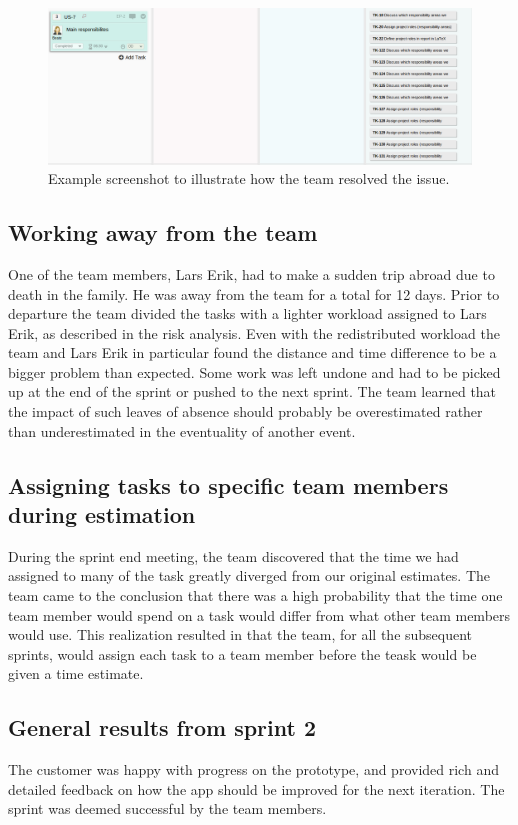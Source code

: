 \begin{figure}[H]
\includegraphics[width=\textwidth]{ch/devProcess/fig/addsTasks.png}
\caption{Example screenshot to illustrate how the team resolved the issue.}
\label{fig:addsTasks}
\end{figure}

\subsection{Working away from the team}
One of the team members, Lars Erik, had to make a sudden trip abroad due to
death in the family. He was away from the team for a total for 12 days. Prior
to departure the team divided the tasks with a lighter workload assigned to Lars
Erik, as described in the risk analysis. Even with the redistributed workload
the team and Lars Erik in particular found the distance and time difference to
be a bigger problem than expected. Some work was left undone and had to be
picked up at the end of the sprint or pushed to the next sprint. The team
learned that the impact of such leaves of absence should probably be
overestimated rather than underestimated in the eventuality of another event.

\subsection{Assigning tasks to specific team members during estimation}
\label{sec:assignEst}
During the sprint end meeting, the team discovered that the time we had assigned to many of the task greatly diverged from our original estimates. The team came to the conclusion that there was a high probability that the time one team member would spend on a task would differ from what other team members would use. This realization resulted in that the team, for all the subsequent sprints, would assign each task to a team member before the teask would be given a time estimate.

\subsection{General results from sprint 2} 
The customer was happy with progress on the prototype, and provided rich and detailed feedback on how the app should be improved for the next iteration. The sprint was deemed successful by the team members.
